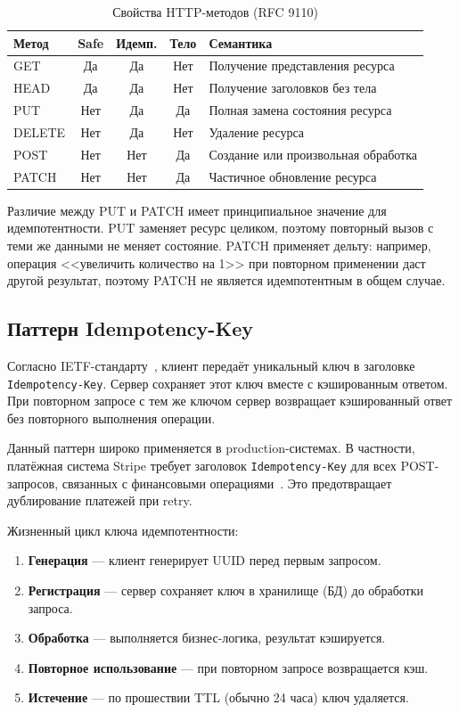 \begin{table}[H]
\centering
\caption{Свойства HTTP-методов (RFC 9110)}
\label{tab:http-methods}
\begin{tabular}{@{}lcccp{5cm}@{}}
\toprule
\textbf{Метод} & \textbf{Safe} & \textbf{Идемп.} & \textbf{Тело} & \textbf{Семантика} \\
\midrule
GET     & Да  & Да  & Нет & Получение представления ресурса \\
HEAD    & Да  & Да  & Нет & Получение заголовков без тела \\
PUT     & Нет & Да  & Да  & Полная замена состояния ресурса \\
DELETE  & Нет & Да  & Нет & Удаление ресурса \\
POST    & Нет & Нет & Да  & Создание или произвольная обработка \\
PATCH   & Нет & Нет & Да  & Частичное обновление ресурса \\
\bottomrule
\end{tabular}
\end{table}

Различие между PUT и PATCH имеет принципиальное значение для идемпотентности. PUT заменяет ресурс целиком, поэтому повторный вызов с теми же данными не меняет состояние. PATCH применяет дельту: например, операция <<увеличить количество на 1>> при повторном применении даст другой результат, поэтому PATCH не является идемпотентным в общем случае.

\subsection{Паттерн Idempotency-Key}

Согласно IETF-стандарту~\cite{ietf-idempotency-key}, клиент передаёт уникальный ключ в заголовке \texttt{Idempotency-Key}. Сервер сохраняет этот ключ вместе с кэшированным ответом. При повторном запросе с тем же ключом сервер возвращает кэшированный ответ без повторного выполнения операции.

Данный паттерн широко применяется в production-системах. В частности, платёжная система Stripe требует заголовок \texttt{Idempotency-Key} для всех POST-запросов, связанных с финансовыми операциями~\cite{stripe-idempotency}. Это предотвращает дублирование платежей при retry.

Жизненный цикл ключа идемпотентности:
\begin{enumerate}
    \item \textbf{Генерация} --- клиент генерирует UUID перед первым запросом.
    \item \textbf{Регистрация} --- сервер сохраняет ключ в хранилище (БД) до обработки запроса.
    \item \textbf{Обработка} --- выполняется бизнес-логика, результат кэшируется.
    \item \textbf{Повторное использование} --- при повторном запросе возвращается кэш.
    \item \textbf{Истечение} --- по прошествии TTL (обычно 24 часа) ключ удаляется.
\end{enumerate}


